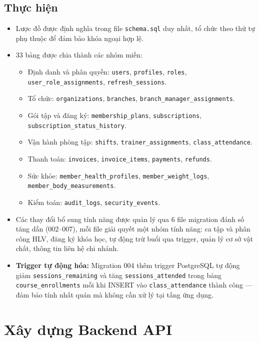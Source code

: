 \subsection{Thực hiện}
\begin{itemize}
    \item Lược đồ được định nghĩa trong file \texttt{schema.sql} duy nhất, tổ chức theo thứ tự phụ thuộc để đảm bảo khóa ngoại hợp lệ.
    \item 33 bảng được chia thành các nhóm miền:
    \begin{itemize}
        \item Định danh và phân quyền: \texttt{users}, \texttt{profiles}, \texttt{roles}, \texttt{user\_role\_assignments}, \texttt{refresh\_sessions}.
        \item Tổ chức: \texttt{organizations}, \texttt{branches}, \texttt{branch\_manager\_assignments}.
        \item Gói tập và đăng ký: \texttt{membership\_plans}, \texttt{subscriptions}, \texttt{subscription\_status\_history}.
        \item Vận hành phòng tập: \texttt{shifts}, \texttt{trainer\_assignments}, \texttt{class\_attendance}.
        \item Thanh toán: \texttt{invoices}, \texttt{invoice\_items}, \texttt{payments}, \texttt{refunds}.
        \item Sức khỏe: \texttt{member\_health\_profiles}, \texttt{member\_weight\_logs}, \texttt{member\_body\_measurements}.
        \item Kiểm toán: \texttt{audit\_logs}, \texttt{security\_events}.
    \end{itemize}
    \item Các thay đổi bổ sung tính năng được quản lý qua 6 file migration đánh số tăng dần (002--007), mỗi file giải quyết một nhóm tính năng: ca tập và phân công HLV, đăng ký khóa học, tự động trừ buổi qua trigger, quản lý cơ sở vật chất, thông tin liên hệ chi nhánh.
    \item \textbf{Trigger tự động hóa:} Migration 004 thêm trigger PostgreSQL tự động giảm \texttt{sessions\_remaining} và tăng \texttt{sessions\_attended} trong bảng \texttt{course\_enrollments} mỗi khi INSERT vào \texttt{class\_attendance} thành công — đảm bảo tính nhất quán mà không cần xử lý tại tầng ứng dụng.
\end{itemize}

\section{Xây dựng Backend API}
